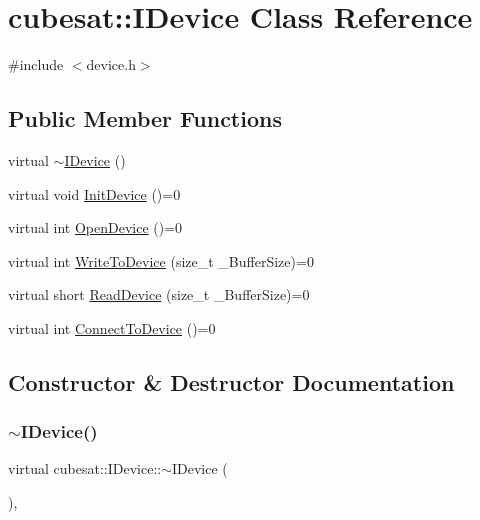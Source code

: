 \hypertarget{classcubesat_1_1IDevice}{}\section{cubesat\+:\+:I\+Device Class Reference}
\label{classcubesat_1_1IDevice}


{\ttfamily \#include $<$device.\+h$>$}

\subsection*{Public Member Functions}
\begin{DoxyCompactItemize}
\item 
virtual \hyperlink{classcubesat_1_1IDevice_a9e0d3be020a12bb66cf90918211fdfcf}{$\sim$\+I\+Device} ()
\item 
virtual void \hyperlink{classcubesat_1_1IDevice_a3cc558ab6d0f71a691424e040ad11051}{Init\+Device} ()=0
\item 
virtual int \hyperlink{classcubesat_1_1IDevice_a543e1cd58ae2c86ec605475ce865fec9}{Open\+Device} ()=0
\item 
virtual int \hyperlink{classcubesat_1_1IDevice_a0972602fbc825d3c34eeec8798f94d6c}{Write\+To\+Device} (size\+\_\+t \+\_\+\+Buffer\+Size)=0
\item 
virtual short \hyperlink{classcubesat_1_1IDevice_a75ffdd9dd5569321f04179a1ac0966d6}{Read\+Device} (size\+\_\+t \+\_\+\+Buffer\+Size)=0
\item 
virtual int \hyperlink{classcubesat_1_1IDevice_a906f6e86a90c7b2b2840381459a0ae6b}{Connect\+To\+Device} ()=0
\end{DoxyCompactItemize}


\subsection{Constructor \& Destructor Documentation}
\mbox{\label{classcubesat_1_1IDevice_a9e0d3be020a12bb66cf90918211fdfcf}} 
\subsubsection{\texorpdfstring{$\sim$\+I\+Device()}{~IDevice()}}
{\footnotesize\ttfamily virtual cubesat\+::\+I\+Device\+::$\sim$\+I\+Device (\begin{DoxyParamCaption}{ }\end{DoxyParamCaption})\hspace{0.3cm}{\ttfamily [inline]}, {\ttfamily [virtual]}}



